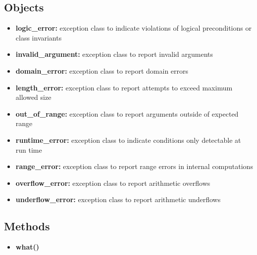 \documentclass{report}
\begin{document}
    \pagebreak \bigbreak \noindent 
    \bigbreak \noindent 
    \subsection{Objects}
    \begin{itemize}
        \item \textbf{logic\_error:} exception class to indicate violations of logical preconditions or class invariants
        \item \textbf{invalid\_argument:} exception class to report invalid arguments
        \item \textbf{domain\_error:} exception class to report domain errors
        \item \textbf{length\_error:} exception class to report attempts to exceed maximum allowed size
        \item \textbf{out\_of\_range:} exception class to report arguments outside of expected range
        \item \textbf{runtime\_error:} exception class to indicate conditions only detectable at run time
        \item \textbf{range\_error:} exception class to report range errors in internal computations
        \item \textbf{overflow\_error:} exception class to report arithmetic overflows
        \item \textbf{underflow\_error:} exception class to report arithmetic underflows
    \end{itemize}
    \bigbreak \noindent 

    \bigbreak \noindent 
    \subsection{Methods}
    \begin{itemize}
        \item \textbf{what()}
    \end{itemize}
\end{document}
